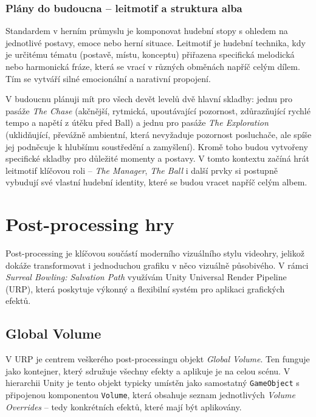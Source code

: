 \subsubsection{Plány do budoucna -- leitmotif a struktura alba}
Standardem v herním průmyslu je komponovat hudební stopy s ohledem na jednotlivé postavy, emoce nebo herní situace. Leitmotif je hudební technika, kdy je určitému tématu (postavě, místu, konceptu) přiřazena specifická melodická nebo harmonická fráze, která se vrací v různých obměnách napříč celým dílem. Tím se vytváří silné emocionální a narativní propojení.

V budoucnu plánuji mít pro všech devět levelů dvě hlavní skladby: jednu pro pasáže \emph{The Chase} (akčnější, rytmická, upoutávající pozornost, zdůrazňující rychlé tempo a napětí z útěku před Ball) a jednu pro pasáže \emph{The Exploration} (uklidňující, převážně ambientní, která nevyžaduje pozornost posluchače, ale spíše jej podněcuje k hlubšímu soustředění a zamyšlení). Kromě toho budou vytvořeny specifické skladby pro důležité momenty a postavy. V tomto kontextu začíná hrát leitmotif klíčovou roli -- \emph{The Manager}, \emph{The Ball} i další prvky si postupně vybudují své vlastní hudební identity, které se budou vracet napříč celým albem.

\section{Post-processing hry}
\label{sec:post-processing-hry}

Post-processing je klíčovou součástí moderního vizuálního stylu videohry, jelikož dokáže transformovat i jednoduchou grafiku v něco vizuálně působivého. V rámci \emph{Surreal Bowling: Salvation Path} využívám Unity Universal Render Pipeline (URP), která poskytuje výkonný a flexibilní systém pro aplikaci grafických efektů.


\subsection{Global Volume}
\label{sec:global-volume}

V URP je centrem veškerého post-processingu objekt \emph{Global Volume}. Ten funguje jako kontejner, který sdružuje všechny efekty a aplikuje je na celou scénu. V hierarchii Unity je tento objekt typicky umístěn jako samostatný \texttt{GameObject} s připojenou komponentou \texttt{Volume}, která obsahuje seznam jednotlivých \emph{Volume Overrides} -- tedy konkrétních efektů, které mají být aplikovány.

